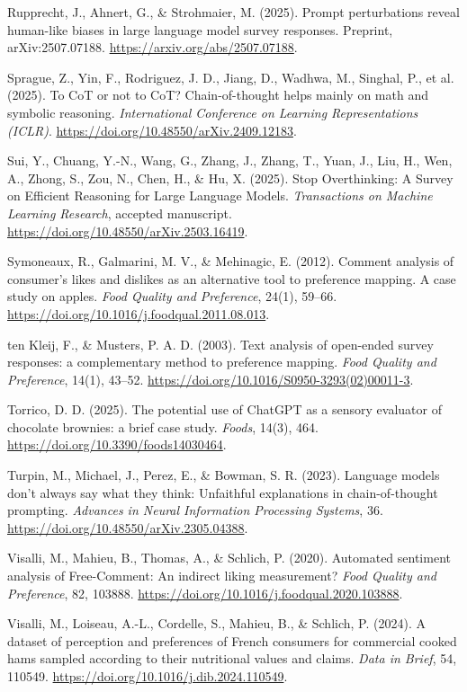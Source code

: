 \documentclass[11pt]{article}
\begin{document}
\noindent Rupprecht, J., Ahnert, G., \& Strohmaier, M. (2025). Prompt
perturbations reveal human-like biases in large language model survey
responses. Preprint, arXiv:2507.07188.
\url{https://arxiv.org/abs/2507.07188}.

\noindent Sprague, Z., Yin, F., Rodriguez, J. D., Jiang, D., Wadhwa, M., Singhal,
P., et al. (2025). To CoT or not to CoT? Chain-of-thought helps mainly on
math and symbolic reasoning. \emph{International Conference on Learning
Representations (ICLR)}. \url{https://doi.org/10.48550/arXiv.2409.12183}.

\noindent Sui, Y., Chuang, Y.-N., Wang, G., Zhang, J., Zhang, T., Yuan, J.,
Liu, H., Wen, A., Zhong, S., Zou, N., Chen, H., \& Hu, X. (2025). Stop
Overthinking: A Survey on Efficient Reasoning for Large Language Models.
\emph{Transactions on Machine Learning Research}, accepted manuscript.
\url{https://doi.org/10.48550/arXiv.2503.16419}.

\noindent Symoneaux, R., Galmarini, M. V., \& Mehinagic, E. (2012). Comment
analysis of consumer's likes and dislikes as an alternative tool to preference
mapping. A case study on apples. \emph{Food Quality and Preference}, 24(1),
59--66. \url{https://doi.org/10.1016/j.foodqual.2011.08.013}.

\noindent ten Kleij, F., \& Musters, P. A. D. (2003). Text analysis of
open-ended survey responses: a complementary method to preference mapping.
\emph{Food Quality and Preference}, 14(1), 43--52.
\url{https://doi.org/10.1016/S0950-3293(02)00011-3}.

\noindent Torrico, D. D. (2025). The potential use of ChatGPT as a sensory
evaluator of chocolate brownies: a brief case study. \emph{Foods}, 14(3), 464.
\url{https://doi.org/10.3390/foods14030464}.

\noindent Turpin, M., Michael, J., Perez, E., \& Bowman, S. R. (2023). Language
models don't always say what they think: Unfaithful explanations in
chain-of-thought prompting. \emph{Advances in Neural Information Processing
Systems}, 36. \url{https://doi.org/10.48550/arXiv.2305.04388}.

\noindent Visalli, M., Mahieu, B., Thomas, A., \& Schlich, P. (2020). Automated
sentiment analysis of Free-Comment: An indirect liking measurement?
\emph{Food Quality and Preference}, 82, 103888.
\url{https://doi.org/10.1016/j.foodqual.2020.103888}.

\noindent Visalli, M., Loiseau, A.-L., Cordelle, S., Mahieu, B., \& Schlich, P.
(2024). A dataset of perception and preferences of French consumers for
commercial cooked hams sampled according to their nutritional values and claims.
\emph{Data in Brief}, 54, 110549. \url{https://doi.org/10.1016/j.dib.2024.110549}.
\end{document}

